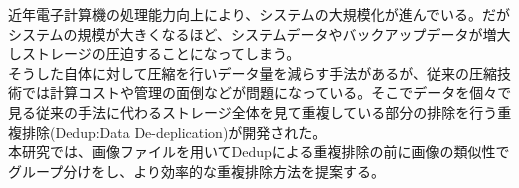 近年電子計算機の処理能力向上により、システムの大規模化が進んでいる。だがシステムの規模が大きくなるほど、システムデータやバックアップデータが増大しストレージの圧迫することになってしまう。\\
そうした自体に対して圧縮を行いデータ量を減らす手法があるが、従来の圧縮技術では計算コストや管理の面倒などが問題になっている。そこでデータを個々で見る従来の手法に代わるストレージ全体を見て重複している部分の排除を行う重複排除(Dedup:Data De-deplication)が開発された。\\
本研究では、画像ファイルを用いてDedupによる重複排除の前に画像の類似性でグループ分けをし、より効率的な重複排除方法を提案する。
